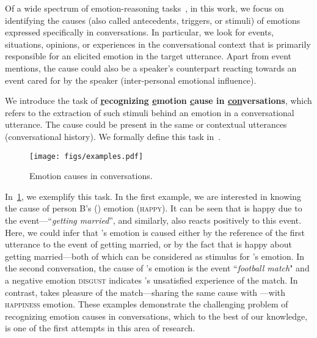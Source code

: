 \documentclass[11pt,a4paper]{article}
\theoremstyle{definition}
\newcommand\emo[1]{\textsc{#1}}
\begin{document}
Of a wide spectrum of emotion-reasoning tasks~\cite{ellsworth2003appraisal},
in this work, we focus on identifying the causes (also called antecedents, triggers, or stimuli) of emotions expressed specifically in conversations. In particular, we look for events, situations, opinions, or experiences in the conversational context that is primarily responsible for an elicited emotion in the target utterance. Apart from event mentions, the cause could also be a speaker's counterpart reacting towards an event cared for by the speaker (inter-personal emotional influence). 

We introduce the task of \textbf{\underline{r}ecognizing \underline{e}motion \underline{c}ause in \underline{con}\-ver\-sa\-tions}, which refers to the extraction of such stimuli behind an emotion in a conversational utterance. The cause could be present in the same or contextual utterances (conversational history). We formally define this task in~.

\begin{figure}[t] 
    \centering 
    \texttt{[image: figs/examples.pdf]} 
    \caption{\footnotesize{Emotion causes in conversations.}}
    \label{fig:examples}
\end{figure}

In~\cref{fig:examples}, we exemplify this task. In the first example, we are interested in knowing the cause of person B's () emotion (\emo{happy}). It can be seen that  is happy due to the event---``\textit{getting married}'', and similarly,  also reacts positively to this event. Here, we could infer that 's emotion is caused either by the reference of the first utterance to the event of getting married, or by the fact that  is happy about getting married---both of which can be considered as stimulus for 's emotion. In the second conversation, the cause of 's emotion is the event ``\textit{football match}" and a negative emotion \emo{disgust} indicates 's unsatisfied experience of the match. In contrast,  takes pleasure of the match---sharing the same cause with ---with \emo{happiness} emotion. These examples demonstrate the challenging problem of recognizing emotion causes in conversations, which to the best of our knowledge, is one of the first attempts in this area of research.
\end{document}
